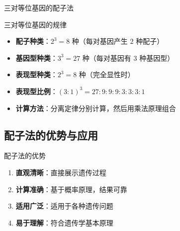 \documentclass[a4paper,11pt]{ctexart}
\begin{document}
\begin{examplebox}{三对等位基因的配子法}
\begin{center}
\end{center}
\end{examplebox}

\begin{lemmabox}{三对等位基因的规律}
\begin{itemize}[leftmargin=2em]
    \item \textbf{配子种类}：$2^3 = 8$ 种（每对基因产生 $2$ 种配子）
    \item \textbf{基因型种类}：$3^3 = 27$ 种（每对基因有 $3$ 种基因型）
    \item \textbf{表现型种类}：$2^3 = 8$ 种（完全显性时）
    \item \textbf{表现型比例}：$(3:1)^3 = 27:9:9:9:3:3:3:1$
    \item \textbf{计算方法}：分离定律分别计算，然后用乘法原理组合
\end{itemize}
\end{lemmabox}

\subsection{配子法的优势与应用}

\begin{lemmabox}{配子法的优势}
\begin{enumerate}[leftmargin=2em]
    \item \textbf{直观清晰}：直接展示遗传过程
    \item \textbf{计算准确}：基于概率原理，结果可靠
    \item \textbf{适用广泛}：适用于各种遗传问题
    \item \textbf{易于理解}：符合遗传学基本原理
\end{enumerate}
\end{lemmabox}
\end{document}
